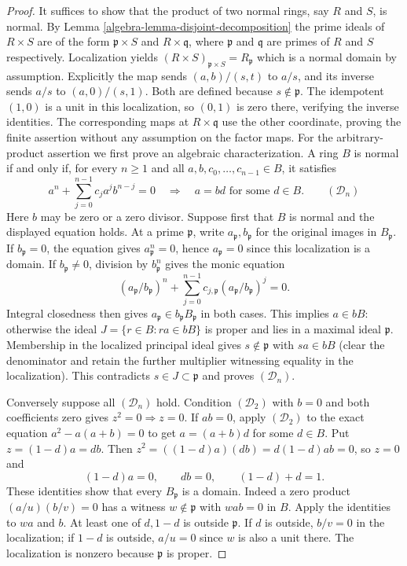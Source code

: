 \begin{proof}
It suffices to show that the product of two normal rings, say $R$ and $S$, is
normal. By Lemma \ref{algebra-lemma-disjoint-decomposition} the prime ideals of
$R\times S$ are of the form $\mathfrak{p}\times S$ and $R\times
\mathfrak{q}$, where $\mathfrak{p}$ and $\mathfrak{q}$ are primes of $R$
and $S$ respectively. Localization yields 
$(R\times S)_{\mathfrak{p}\times S}=R_{\mathfrak{p}}$ which is a normal domain
by assumption. Explicitly the map sends
$(a,b)/(s,t)$ to $a/s$, and its inverse sends $a/s$ to
$(a,0)/(s,1)$. Both are defined because $s\notin\mathfrak p$.
The idempotent $(1,0)$ is a unit in this localization, so $(0,1)$
is zero there, verifying the inverse identities. The corresponding
maps at $R\times\mathfrak q$ use the other coordinate, proving
the finite assertion without any assumption on the factor maps.
\medskip\noindent
For the arbitrary-product assertion we first prove an algebraic
characterization. A ring $B$ is normal if and only if, for every
$n\geq1$ and all $a,b,c_0,\ldots,c_{n-1}\in B$, it satisfies
$$
a^n+\sum_{j=0}^{n-1}c_ja^jb^{n-j}=0
\quad\Longrightarrow\quad a=bd\text{ for some }d\in B.
\qquad(\mathcal D_n)
$$
Here $b$ may be zero or a zero divisor.
Suppose first that $B$ is normal and the displayed equation holds.
At a prime $\mathfrak p$, write $a_{\mathfrak p},b_{\mathfrak p}$
for the original images in $B_{\mathfrak p}$. If
$b_{\mathfrak p}=0$, the equation gives $a_{\mathfrak p}^n=0$,
hence $a_{\mathfrak p}=0$ since this localization is a domain.
If $b_{\mathfrak p}\ne0$, division by $b_{\mathfrak p}^n$
gives the monic equation
$$
(a_{\mathfrak p}/b_{\mathfrak p})^n+
\sum_{j=0}^{n-1}c_{j,\mathfrak p}
 (a_{\mathfrak p}/b_{\mathfrak p})^j=0.
$$
Integral closedness then gives
$a_{\mathfrak p}\in b_{\mathfrak p}B_{\mathfrak p}$ in both cases.
This implies $a\in bB$: otherwise the ideal
$J=\{r\in B:ra\in bB\}$ is proper and lies in a maximal ideal
$\mathfrak p$. Membership in the localized principal ideal gives
$s\notin\mathfrak p$ with $sa\in bB$ (clear the denominator and
retain the further multiplier witnessing equality in the localization).
This contradicts $s\in J\subset\mathfrak p$ and proves
$(\mathcal D_n)$.

Conversely suppose all $(\mathcal D_n)$ hold. Condition
$(\mathcal D_2)$ with $b=0$ and both coefficients zero gives
$z^2=0\Rightarrow z=0$. If $ab=0$, apply $(\mathcal D_2)$
to the exact equation $a^2-a(a+b)=0$ to get
$a=(a+b)d$ for some $d\in B$. Put
$z=(1-d)a=db$. Then
$z^2=((1-d)a)(db)=d(1-d)ab=0$, so $z=0$ and
$$
(1-d)a=0,\qquad db=0,\qquad (1-d)+d=1.
$$
These identities show that every $B_{\mathfrak p}$ is a domain.
Indeed a zero product $(a/u)(b/v)=0$ has a witness
$w\notin\mathfrak p$ with $wab=0$ in $B$. Apply the identities
to $wa$ and $b$. At least one of $d,1-d$ is outside
$\mathfrak p$. If $d$ is outside, $b/v=0$ in the localization;
if $1-d$ is outside, $a/u=0$ since $w$ is also a unit there.
The localization is nonzero because $\mathfrak p$ is proper.


\end{proof}
